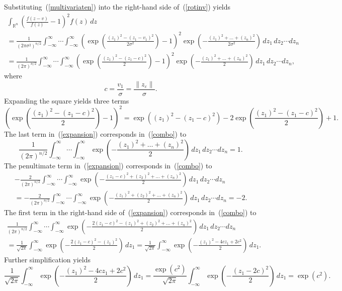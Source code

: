 \documentclass[]{fairmeta}
\renewcommand{\epsilon}{\varepsilon}
\begin{document}
Substituting~(\ref{multivariaten}) into the right-hand side of~(\ref{rotinv})
yields
%
\begin{multline}
\label{combo}
\int_{\mathbb{R}^n} \left( \frac{f(z - v)}{f(z)} - 1 \right)^2 f(z) \, dz \\
= \frac{1}{(2 \pi \sigma^2)^{n/2}}
\int_{-\infty}^{\infty} \cdots \int_{-\infty}^{\infty}
\left( \exp\left(\frac{(z_1)^2 - (z_1-v_1)^2}{2 \sigma^2}\right) - 1 \right)^2
\exp\left(-\frac{(z_1)^2 + \dots + (z_n)^2}{2 \sigma^2}\right)
\, dz_1 \, dz_2 \cdots dz_n \\
= \frac{1}{(2 \pi)^{n/2}}
\int_{-\infty}^{\infty} \cdots \int_{-\infty}^{\infty}
\left( \exp\left(\frac{(z_1)^2 - (z_1-c)^2}{2}\right) - 1 \right)^2
\exp\left(-\frac{(z_1)^2 + \dots + (z_n)^2}{2}\right)
\, dz_1 \, dz_2 \cdots dz_n,
\end{multline}
%
where
%
\begin{equation}
c = \frac{v_1}{\sigma} = \frac{\|z_{\epsilon}\|}{\sigma}.
\end{equation}
%
Expanding the square yields three terms
%
\begin{equation}
\label{expansion}
\left( \exp\left(\frac{(z_1)^2 - (z_1-c)^2}{2}\right) - 1 \right)^2
= \exp\left((z_1)^2 - (z_1-c)^2\right)
- 2 \exp\left(\frac{(z_1)^2 - (z_1-c)^2}{2}\right) + 1.
\end{equation}
%
The last term in~(\ref{expansion}) corresponds in~(\ref{combo}) to
%
\begin{equation}
\frac{1}{(2 \pi)^{n/2}} \int_{-\infty}^{\infty} \cdots \int_{-\infty}^{\infty}
\exp\left(-\frac{(z_1)^2 + \dots + (z_n)^2}{2}\right)
\, dz_1 \, dz_2 \cdots dz_n = 1.
\end{equation}
%
The penultimate term in~(\ref{expansion}) corresponds in~(\ref{combo}) to
%
\begin{multline}
-\frac{2}{(2 \pi)^{n/2}} \int_{-\infty}^{\infty} \cdots \int_{-\infty}^{\infty}
\exp\left(-\frac{(z_1-c)^2 + (z_2)^2 + \dots + (z_n)^2}{2}\right)
\, dz_1 \, dz_2 \cdots dz_n \\
= -\frac{2}{(2 \pi)^{n/2}}
\int_{-\infty}^{\infty} \cdots \int_{-\infty}^{\infty}
\exp\left(-\frac{(z_1)^2 + (z_2)^2 + \dots + (z_n)^2}{2}\right)
\, dz_1 \, dz_2 \cdots dz_n = -2.
\end{multline}
%
The first term in the right-hand side of~(\ref{expansion})
corresponds in~(\ref{combo}) to
%
\begin{multline}
\frac{1}{(2 \pi)^{n/2}} \int_{-\infty}^{\infty} \cdots \int_{-\infty}^{\infty}
\exp\left(-\frac{2(z_1-c)^2 - (z_1)^2 + (z_2)^2 + \dots + (z_n)^2}{2}\right)
\, dz_1 \, dz_2 \cdots dz_n \\
= \frac{1}{\sqrt{2 \pi}} \int_{-\infty}^{\infty}
\exp\left(-\frac{2(z_1-c)^2 - (z_1)^2}{2}\right) \, dz_1
= \frac{1}{\sqrt{2 \pi}} \int_{-\infty}^{\infty}
\exp\left(-\frac{(z_1)^2 - 4cz_1 + 2c^2}{2}\right) \, dz_1.
\end{multline}
%
Further simplification yields
%
\begin{equation}
\frac{1}{\sqrt{2 \pi}} \int_{-\infty}^{\infty}
\exp\left(-\frac{(z_1)^2 - 4cz_1 + 2c^2}{2}\right) \, dz_1
= \frac{\exp(c^2)}{\sqrt{2 \pi}} \int_{-\infty}^{\infty}
\exp\left(-\frac{(z_1 - 2c)^2}{2}\right) \, dz_1
= \exp(c^2).
\end{equation}
\end{document}
